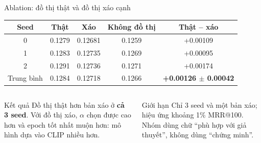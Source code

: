 \documentclass[10pt, aspectratio=169]{beamer}
\makeatletter
\newcommand{\mrr}{MRR@100}
\newcommand{\pmm}{\ensuremath{\pm}}
\makeatother
\begin{document}
\begin{frame}{Ablation: đồ thị thật và đồ thị xáo cạnh}
  \centering\small
  \begin{tabular}{c c c c c}
    \toprule
    \textbf{Seed} & \textbf{Thật} & \textbf{Xáo} & \textbf{Không đồ thị} & \textbf{Thật -- xáo} \\
    \midrule
    0 & 0.1279 & 0.12681 & 0.1259 & +0.00109 \\
    1 & 0.1283 & 0.12735 & 0.1269 & +0.00095 \\
    2 & 0.1291 & 0.12736 & 0.1271 & +0.00174 \\
    \midrule
    Trung bình & 0.1284 & 0.12718 & 0.1266 & \textbf{+0.00126 \pmm{} 0.00042} \\
    \bottomrule
  \end{tabular}
  \vfill
  \begin{columns}[T]
      \begin{block}{Kết quả}
        Đồ thị thật hơn bản xáo ở \textbf{cả 3 seed}. Với đồ thị xáo, $\alpha$ chọn được cao hơn và epoch tốt nhất muộn hơn: mô hình dựa vào CLIP nhiều hơn.
      \end{block}
      \begin{alertblock}{Giới hạn}
        Chỉ 3 seed và một bản xáo; hiệu ứng khoảng 1\% \mrr. Nhóm dùng chữ ``phù hợp với giả thuyết'', không dùng ``chứng minh''.
      \end{alertblock}
  \end{columns}
\end{frame}
\end{document}
